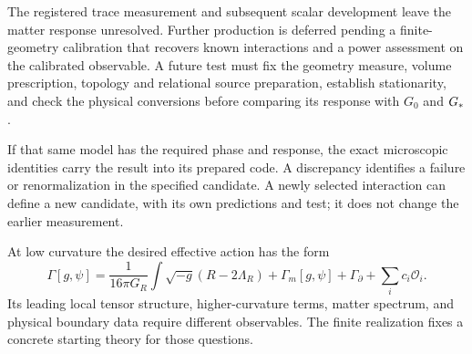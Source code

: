 The registered trace measurement and subsequent scalar development leave the matter response unresolved. Further production is deferred pending a finite-geometry calibration that recovers known interactions and a power assessment on the calibrated observable. A future test must fix the geometry measure, volume prescription, topology and relational source preparation, establish stationarity, and check the physical conversions before comparing its response with $G_0$ and $G_*$.

If that same model has the required phase and response, the exact microscopic identities carry the result into its prepared code. A discrepancy identifies a failure or renormalization in the specified candidate. A newly selected interaction can define a new candidate, with its own predictions and test; it does not change the earlier measurement.

At low curvature the desired effective action has the form
\begin{equation}
\Gamma[g,\psi]
=\frac1{16\pi G_R}\int\sqrt{-g}(R-2\Lambda_R)
+\Gamma_m[g,\psi]+\Gamma_\partial+\sum_i c_i\mathcal O_i.
\end{equation}
Its leading local tensor structure, higher-curvature terms, matter spectrum, and physical boundary data require different observables. The finite realization fixes a concrete starting theory for those questions.
